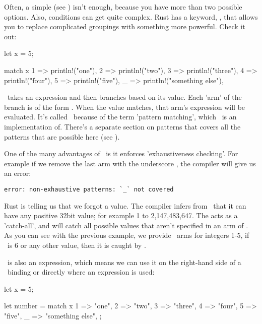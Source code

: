 Often, a simple  (see ) isn't enough, because you have more than two possible options. Also, 
conditions can get quite complex. Rust has a keyword, \match, that allows you to replace complicated  groupings with 
something more powerful. Check it out:

\begin{rustc}
let x = 5;

match x {
    1 => println!("one"),
    2 => println!("two"),
    3 => println!("three"),
    4 => println!("four"),
    5 => println!("five"),
    _ => println!("something else"),
}
\end{rustc}

\match\ takes an expression and then branches based on its value. Each 'arm' of the branch is of the form . When 
the value matches, that arm's expression will be evaluated. It's called \match\ because of the term 'pattern matching', which \match\ is 
an implementation of. There's a separate section on patterns that covers all the patterns that are possible here (see 
).

\blank

One of the many advantages of \match\ is it enforces 'exhaustiveness checking'. For example if we remove the last arm with the 
underscore \code{\_}, the compiler will give us an error:

\begin{verbatim}
error: non-exhaustive patterns: `_` not covered
\end{verbatim}

Rust is telling us that we forgot a value. The compiler infers from \x\ that it can have any positive 32bit value; for example 1 
to 2,147,483,647. The \code{\_} acts as a 'catch-all', and will catch all possible values that aren't specified in an arm of \match. 
As you can see with the previous example, we provide \match\ arms for integers 1-5, if \x\ is 6 or any other value, then it is caught 
by \code{\_}.

\blank

\match\ is also an expression, which means we can use it on the right-hand side of a \keylet\ binding or directly where an expression 
is used:

\begin{rustc}
let x = 5;

let number = match x {
    1 => "one",
    2 => "two",
    3 => "three",
    4 => "four",
    5 => "five",
    _ => "something else",
};
\end{rustc}

